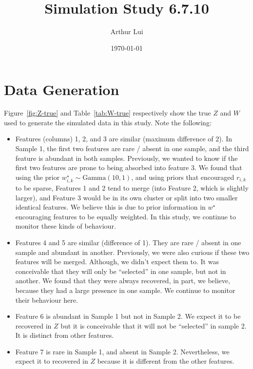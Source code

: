 \documentclass[10pt]{article} %
\title{Simulation Study 6.7.10}
\author{Arthur Lui}
\date{\today} %
\newcommand{\Gam}{ \text{Gamma} }
\begin{document}
\maketitle



\section{Data Generation}\label{sec:data-generation}
Figure~\ref{fig:Z-true} and Table~\ref{tab:W-true} respectively show the true
$Z$ and $W$ used to generate the simulated data in this study. Note the following:
\begin{itemize}
  \item Features (columns) 1, 2, and 3 are similar (maximum difference of 2).
    In Sample 1, the first two features are rare / absent in one sample, and
    the third feature is abundant in both samples. Previously, we wanted to
    know if the first two features are prone to being absorbed into feature 3. We
    found that using the prior $w^\star_{i,k} \sim \Gam(10, 1)$, and using priors
    that encouraged $r_{i,k}$ to be sparse, Features 1 and 2 tend to merge
    (into Feature 2, which is slightly larger), and Feature 3 would be in its
    own cluster or split into two smaller identical features. We believe this is 
    due to prior information in $w^\star$ encouraging features to be equally weighted.
    In this study, we continue to monitor these kinds of behaviour.
  \item Features 4 and 5 are similar (difference of 1). They are rare / absent
    in one sample and abundant in another. Previously, we were also curious if
    these two features will be merged. Although, we didn't expect them to. It was
    conceivable that they will only be ``selected'' in one sample, but not in
    another. We found that they were always recovered, in part, we believe, because
    they had a large presence in one sample. We continue to monitor their behaviour
    here.
  \item Feature 6 is abundant in Sample 1 but not in Sample 2. We expect it to be
    recovered in $Z$ but it is conceivable that it will not be ``selected'' in sample
    2. It is distinct from other features.
  \item Feature 7 is rare in Sample 1, and absent in Sample 2. Nevertheless, we
    expect it to recovered in $Z$ because it is different from the other
    features.
\end{itemize}
\end{document}
